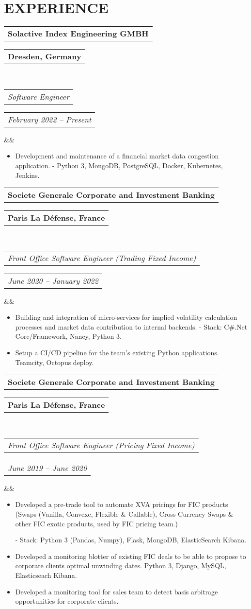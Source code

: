 \documentclass[11pt,a4paper,roman]{moderncv}        %
\makeatletter
\newcommand*{\customcventry}[7][.25em]{
  \begin{tabular}{@{}l} 
    {\bfseries #4}
  \end{tabular}
  \hfill%
  \begin{tabular}{l@{}}
     {\bfseries #5}
  \end{tabular} \\
  \begin{tabular}{@{}l} 
    {\itshape #3}
  \end{tabular}
  \hfill%
  \begin{tabular}{l@{}}
     {\itshape #2}
  \end{tabular}
  \ifx&#7&%
  \else{\\%
    \begin{minipage}{\maincolumnwidth}%
      \small#7%
    \end{minipage}}\fi%
  \par\addvspace{#1}}
\makeatother
\begin{document}
\section{EXPERIENCE}
%
{\customcventry{February 2022 – Present }{Software Engineer }{Solactive Index Engineering GMBH}{Dresden, Germany}{}{}
{\begin{itemize}
  \item Development and maintenance of a financial market data congestion application. 
    \newline - Python 3, MongoDB, PostgreSQL, Docker, Kubernetes, Jenkins.
\end{itemize}
}

{\customcventry{June 2020 – January 2022 }{Front Office Software Engineer (Trading Fixed Income)}{Societe Generale Corporate and Investment Banking}{Paris La Défense, France}{}{}
{\begin{itemize}
  \item Building and integration of micro-services for implied volatility calculation processes and market data contribution to internal backends.
    \newline - Stack: C\#.Net Core/Framework, Nancy, Python 3.

  \item Setup a CI/CD pipeline for the team's existing Python applications. Teamcity, Octopus deploy.
\end{itemize}
}

{\customcventry{June 2019 – June 2020}{Front Office Software Engineer (Pricing Fixed Income)}{Societe Generale Corporate and Investment Banking}{Paris La Défense, France}{}{}
{\begin{itemize}
  \item Developed a pre-trade tool to automate XVA pricings for FIC products (Swaps (Vanilla, Convexe, Flexible \& Callable), Cross Currency Swaps \& other FIC exotic products, used by FIC pricing team.)

  	\newline - Stack: Python 3 (Pandas, Numpy), Flask, MongoDB, ElasticSearch Kibana.
  \item Developed a monitoring blotter of existing FIC deals to be able to propose to corporate clients optimal unwinding dates. Python 3, Django, MySQL, Elasticseach Kibana.
  \item Developed a monitoring tool for sales team to detect basis arbitrage opportunities for corporate clients.
  
\end{itemize}
}

}}}
\end{document}
